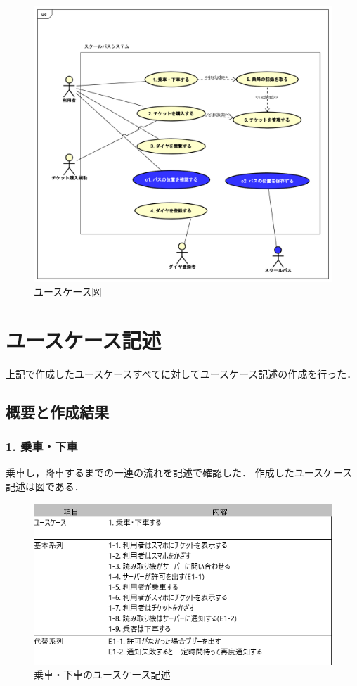\documentclass[documentclass]{jsarticle}
\begin{document}
\begin{figure}[H]
  \begin{center}
    \includegraphics*[scale=0.4]{figure/3-1.png}
  \end{center}
  \caption{ユースケース図}
  \label{fig:3-1}
\end{figure}
\newpage

\section{ユースケース記述}
上記で作成したユースケースすべてに対してユースケース記述の作成を行った．
\subsection*{概要と作成結果}
\subsubsection*{1. 乗車・下車}
乗車し，降車するまでの一連の流れを記述で確認した．
作成したユースケース記述は図である．

\begin{figure}[H]
  \begin{center}
    \includegraphics*[scale=0.6]{figure/4-1.png}
  \end{center}
  \caption{乗車・下車のユースケース記述}
  \label{fig:4-1}
\end{figure}
\end{document}
